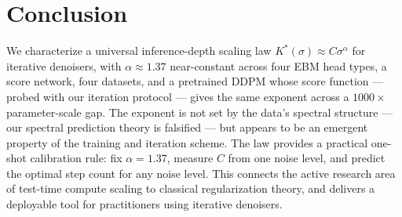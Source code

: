 \documentclass[letterpaper]{article}
\begin{document}
\section{Conclusion}
\label{sec:conclusion}

We characterize a universal inference-depth scaling law
$K^*(\sigma) \approx C\sigma^\alpha$ for iterative denoisers,
with $\alpha \approx 1.37$ near-constant across four EBM head types,
a score network, four datasets, and a pretrained DDPM whose score
function --- probed with our iteration protocol --- gives the same
exponent across a $1000\times$ parameter-scale gap.
The exponent is not set by the data's spectral structure ---
our spectral prediction theory is falsified --- but appears to be
an emergent property of the training and iteration scheme.
The law provides a practical one-shot calibration rule:
fix $\alpha = 1.37$, measure $C$ from one noise level,
and predict the optimal step count for any noise level.
This connects the active research area of test-time compute scaling
to classical regularization theory, and delivers a deployable tool
for practitioners using iterative denoisers.



\end{document}
